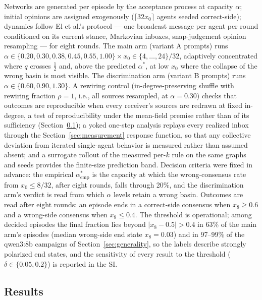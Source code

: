 \documentclass[9pt,twocolumn]{extarticle}
\newcommand{\astar}{\alpha^{*}}
\begin{document}
Networks are generated per episode by the acceptance process at capacity
$\alpha$; initial opinions are assigned exogenously ($\lceil 32 x_0 \rceil$
agents seeded correct-side); dynamics follow El et al.'s protocol --- one
broadcast message per agent per round conditioned on its current stance,
Markovian inboxes, snap-judgement opinion resampling --- for eight rounds. The
main arm (variant A prompts) runs $\alpha \in \{0.20, 0.30, 0.38, 0.45, 0.55,
1.00\} \times x_0 \in \{4,\dots,24\}/32$, adaptively concentrated where $q$
crosses $\tfrac12$ and, above the predicted $\astar$, at low $x_0$ where the
collapse of the wrong basin is most visible. The discrimination arm (variant B
prompts) runs $\alpha \in \{0.60, 0.90, 1.30\}$. A rewiring control
(in-degree-preserving shuffle with rewiring fraction $\rho = 1$, i.e., all sources resampled, at $\alpha = 0.30$) checks
that outcomes are reproducible when every receiver's sources are redrawn at
fixed in-degree, a test of reproducibility under the mean-field premise rather
than of its sufficiency (Section~\ref{sec:results}); a yoked one-step analysis
replays every realized inbox through the Section~\ref{sec:measurement}
response function, so that any collective deviation from iterated single-agent
behavior is measured rather than assumed absent; and a surrogate rollout of
the measured per-$k$ rule on the same graphs and seeds provides the
finite-size prediction band. Decision criteria were fixed in advance: the
empirical $\astar_{\mathrm{emp}}$ is the capacity at which the wrong-consensus
rate from $x_0 \le 8/32$, after eight rounds, falls through 20\%, and the
discrimination arm's verdict is read from which $\alpha$ levels retain a
wrong basin. Outcomes are read after eight rounds: an episode ends in a
correct-side consensus when $x_8 \ge 0.6$ and a wrong-side consensus when
$x_8 \le 0.4$. The threshold is operational; among decided episodes the final
fraction lies beyond $|x_8 - 0.5| > 0.4$ in 63\% of the main arm's episodes
(median wrong-side end state $x_8 = 0.03$) and in 97--99\% of the qwen3:8b
campaigns of Section~\ref{sec:generality}, so the labels describe strongly
polarized end states, and the sensitivity of every result to the threshold
($\delta \in \{0.05, 0.2\}$) is reported in the SI.

\subsection{Results}\label{sec:results}
\end{document}
